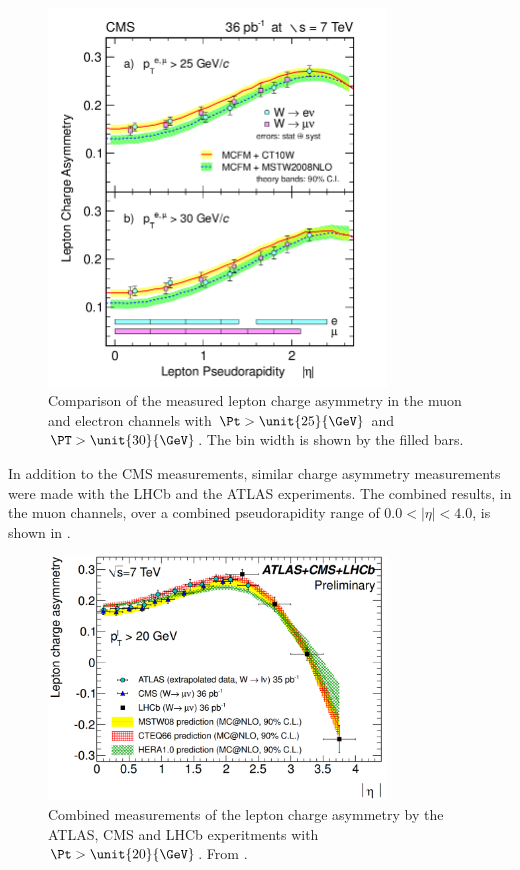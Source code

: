 \begin{figure}[htbp]
  \begin{center}
  \includegraphics*[width=0.8\textwidth]{combined}
  \caption[Comparison of the measured lepton charge asymmetry in the muon and
electron channels] { Comparison of the measured lepton charge asymmetry in the
muon and electron channels with $\Pt>\unit{25}{\GeV}$ and $\PT>\unit{30}{\GeV}$.
The bin width is shown by the filled bars\cite{asym36}.}
  \label{fig:combined}
  \end{center}
\end{figure}

In addition to the CMS measurements, similar charge asymmetry measurements were
made with the LHCb and the ATLAS experiments. The combined results, in the muon
channels, over a combined pseudorapidity range of $0.0 < |\eta | < 4.0$, is
shown in .
\begin{figure}[htbp]
  \begin{center}
  \includegraphics*[width=0.8\textwidth]{atlas_cms_lhcb}
  \caption{Combined measurements of the lepton charge asymmetry by the ATLAS,
CMS and LHCb experitments with $\Pt>\unit{20}{\GeV}$. From
\cite{ATLAS-CONF-2011-129}.}
  \label{fig:ex_combined}
  \end{center}
\end{figure}


